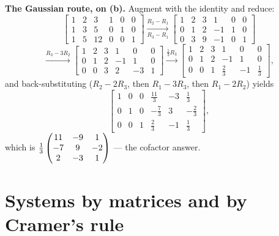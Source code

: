 \begin{solution}
\medskip
\textbf{The Gaussian route, on (b).} Augment with the identity and reduce:
\[
\left[\begin{array}{ccc|ccc}
1&2&3&1&0&0\\ 1&3&5&0&1&0\\ 1&5&12&0&0&1
\end{array}\right]
\xrightarrow[R_3-R_1]{R_2-R_1}
\left[\begin{array}{ccc|ccc}
1&2&3&1&0&0\\ 0&1&2&-1&1&0\\ 0&3&9&-1&0&1
\end{array}\right]
\]
\[
\xrightarrow{R_3-3R_2}
\left[\begin{array}{ccc|ccc}
1&2&3&1&0&0\\ 0&1&2&-1&1&0\\ 0&0&3&2&-3&1
\end{array}\right]
\xrightarrow{\tfrac13 R_3}
\left[\begin{array}{ccc|ccc}
1&2&3&1&0&0\\ 0&1&2&-1&1&0\\ 0&0&1&\tfrac23&-1&\tfrac13
\end{array}\right],
\]
and back-substituting ($R_2-2R_3$, then $R_1-3R_3$, then $R_1-2R_2$) yields
\[
\left[\begin{array}{ccc|ccc}
1&0&0&\tfrac{11}{3}&-3&\tfrac13\\
0&1&0&-\tfrac73&3&-\tfrac23\\
0&0&1&\tfrac23&-1&\tfrac13
\end{array}\right],
\]
which is $\tfrac13\begin{pmatrix}11&-9&1\\-7&9&-2\\2&-3&1\end{pmatrix}$ --- the cofactor answer.

\end{solution}

\section{Systems by matrices and by Cramer's rule}

